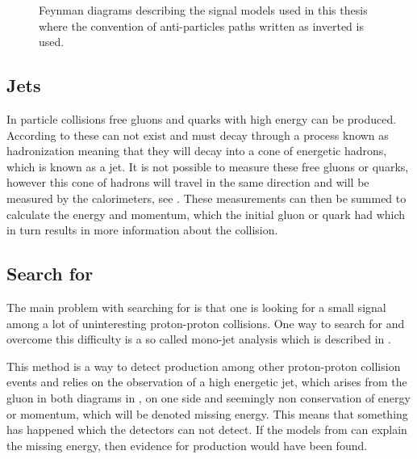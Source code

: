  \begin{figure}[H] %
    \hfill
    \caption{Feynman diagrams describing the signal models used in this thesis where the convention of anti-particles paths written as inverted is used.}
    \label{fig:opfeyn}
  \end{figure}


\subsection{Jets}\label{sec:tb:subsec:jets}
In particle collisions free gluons and quarks with high energy can be produced. According to \abbrQFT these can not exist and must decay through a process known as hadronization meaning that they will decay into a cone of energetic hadrons, which is known as a jet. It is not possible to measure these free gluons or quarks, however this cone of hadrons will travel in the same direction and will be measured by the calorimeters, see . These measurements can then be summed to calculate the energy and momentum, which the initial gluon or quark had which in turn results in more information about the collision.

\subsection{Search for \abbrWIMPS}\label{sec:tb:subsec:WIMPS}
The main problem with searching for \abbrWIMPS is that one is looking for a small signal among a lot of uninteresting proton-proton collisions. One way to search for \abbrWIMPS and overcome this difficulty is a so called mono-jet analysis which is described in . 

This method is a way to detect \abbrWIMP production among other proton-proton collision events and relies on the observation of a high energetic jet, which arises from the gluon in both diagrams in , on one side and seemingly non conservation of energy or momentum, which will be denoted missing energy. This means that something has happened which the detectors can not detect. If the models from  can explain the missing energy, then evidence for \abbrWIMP production would have been found.

